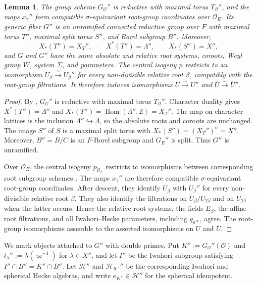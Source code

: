 \documentclass[12pt]{article}
\numberwithin{equation}{section}
\newtheorem{lemma}[theorem]{Lemma}
\theoremstyle{definition}
\theoremstyle{remark}
\theoremstyle{plain}
\begin{document}
\begin{lemma}\label{lem:extended_group}
The group scheme $G_{\mathcal O}''$ is reductive with maximal torus $T_{\mathcal O}''$, and the maps $x_\gamma''$ form compatible $\sigma$-equivariant root-group coordinates over $\mathcal O_E$. Its generic fiber $G''$ is an unramified connected reductive group over $F$ with maximal torus $T''$, maximal split torus $S''$, and Borel subgroup $B''$. Moreover,
$$X_*(T'') = X_T'', \qquad X^*(T'') = \Lambda'', \qquad X_*(S'') = X'',$$
and $G$ and $G''$ have the same absolute and relative root systems, coroots, Weyl group $W$, system $\Sigma$, and parameters. The central isogeny $p$ restricts to an isomorphism
$U_\beta\xrightarrow{\sim}U_\beta''$ for every non-divisible relative root $\beta$, compatibly with the root-group filtrations. It therefore induces isomorphisms $U\xrightarrow{\sim}U''$ and $\overline U\xrightarrow{\sim}\overline U''$.
\end{lemma}
\begin{proof}
By \cite[Corollary 3.3.5]{ConradRGS}, $G_{\mathcal O}''$ is reductive with maximal torus $T_{\mathcal O}''$. Character duality gives $X^*(T'')=\Lambda''$ and $X_*(T'')=\operatorname{Hom}(\Lambda'',\mathbb Z)=X_T''$. The map on character lattices is the inclusion $\Lambda''\hookrightarrow\Lambda$, so the absolute roots and coroots are unchanged. The image $S''$ of $S$ is a maximal split torus with $X_*(S'')=(X_T'')^\sigma=X''$.
Moreover, $B''=B/C$ is an $F$-Borel subgroup and $G_E''$ is split. Thus $G''$ is unramified.

Over $\mathcal O_E$, the central isogeny $p_{\mathcal O_E}$ restricts to isomorphisms between corresponding root subgroup schemes \cite[Lemma 6.1.4 and Example 6.1.9]{ConradRGS}. The maps $x_\gamma''$ are therefore compatible $\sigma$-equivariant root-group coordinates. After descent, they identify $U_\beta$ with $U_\beta''$ for every non-divisible relative root $\beta$. They also identify the filtrations on $U_\beta/U_{2\beta}$ and on $U_{2\beta}$ when the latter occurs. Hence the relative root systems, the fields $E_\beta$, the affine-root filtrations, and all Iwahori--Hecke parameters, including $q_{a*}$, agree. The root-group isomorphisms assemble to the asserted isomorphisms on $U$ and $\overline U$.
\end{proof}

We mark objects attached to $G''$ with double primes. Put $K'':=G_{\mathcal O}''(\mathcal O)$ and $t_\lambda'':=\lambda(\varpi^{-1})$ for $\lambda\in X''$, and let $I''$ be the Iwahori subgroup satisfying $I''\cap B''=K''\cap B''$. Let $\mathcal H''$ and $\mathcal H_{K''}''$ be the corresponding Iwahori and spherical Hecke algebras, and write $e_{K''}\in\mathcal H''$ for the spherical idempotent.
\end{document}
